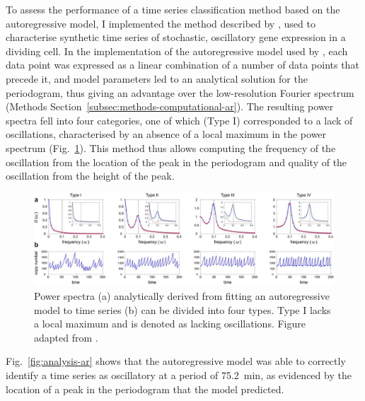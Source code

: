 To assess the performance of a time series classification method based on the autoregressive model, I implemented the method described by \textcite{jiaFrequencyDomainAnalysis2020}, used to characterise synthetic time series of stochastic, oscillatory gene expression in a dividing cell.
In the implementation of the autoregressive model used by \textcite{jiaFrequencyDomainAnalysis2020}, each data point was expressed as a linear combination of a number of data points that precede it, and model parameters led to an analytical solution for the periodogram, thus giving an advantage over the low-resolution Fourier spectrum (Methods Section~\ref{subsec:methods-computational-ar}).
The resulting power spectra fell into four categories, one of which (Type I) corresponded to a lack of oscillations, characterised by an absence of a local maximum in the power spectrum (Fig.\ \ref{fig:analysis-ar-classification}).
This method thus allows computing the frequency of the oscillation from the location of the peak in the periodogram and quality of the oscillation from the height of the peak.

\begin{figure}[b!]
  \centering
  \includegraphics[width=1.0\textwidth]{jiaFrequencyDomainAnalysis2020_2ab_adapted}
  \caption[
    Power spectra analytically derived from fitting an autoregressive model to time series can be divided into four types.
  ]{
    Power spectra (a) analytically derived from fitting an autoregressive model to time series (b) can be divided into four types.
    Type I lacks a local maximum and is denoted as lacking oscillations.
    Figure adapted from \textcite{jiaFrequencyDomainAnalysis2020}.
  }
  \label{fig:analysis-ar-classification}
\end{figure}

\pagebreak

Fig.\ \ref{fig:analysis-ar} shows that the autoregressive model was able to correctly identify a time series as oscillatory at a period of \SI{75.2}{\minute}, as evidenced by the location of a peak in the periodogram that the model predicted.

